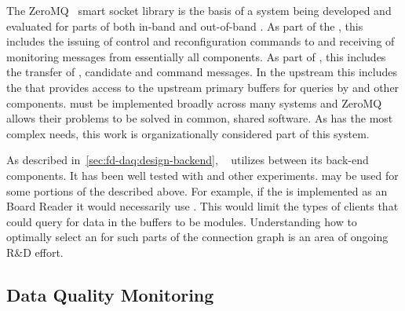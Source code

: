 The ZeroMQ~\cite{zeromq} smart socket library is 
the basis of a system being developed and evaluated for parts of both in-band and out-of-band . 
As part of the , this includes the issuing of control and reconfiguration commands to and receiving of monitoring messages from essentially all  components. 
As part of , this includes the transfer of , candidate and command messages. 
In the upstream  this includes the  that  provides access to the upstream  primary buffers for queries by  and other components. 
  must be implemented broadly across many  systems and ZeroMQ allows their problems to be solved in common, shared software.  As  has the most complex   needs, this work is organizationally considered part of this system.


As described in~\ref{sec:fd-daq:design-backend}, ~\cite{artdaq} utilizes   between its back-end components. 
It has been well tested with  and other experiments. 
 may be used for some portions of the   described above. 
For example, if the  is implemented as an  Board Reader it would necessarily use   . 
This would limit the types of clients that could query for data in the buffers to be  modules. 
Understanding how to optimally select an   for such parts of the  connection graph is an area of ongoing R\&D effort.


\subsection{Data Quality Monitoring}
\label{sec:fd-daq:design-data-quality}

